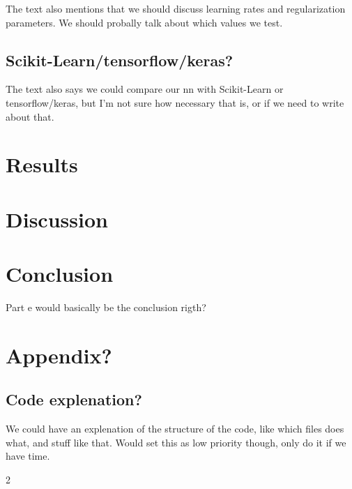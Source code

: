 \documentclass[a4paper,10pt,english]{article}
\begin{document}
\begin{multicols*}{2}
The text also mentions that we should discuss learning rates and regularization parameters. We should probally talk about which values we test. 


\subsection*{Scikit-Learn/tensorflow/keras?}

The text also says we could compare our nn with Scikit-Learn or tensorflow/keras, but I'm not sure how necessary that is, or if we need to write about that.




\section*{Results}





\section*{Discussion}







\section*{Conclusion}

Part e would basically be the conclusion rigth?



\section*{Appendix?}

\subsection*{Code explenation?}

We could have an explenation of the structure of the code, like which files does what, and stuff like that. Would set this as low priority though, only do it if we have time.



{}

\end{multicols*}{2}
\end{document}
